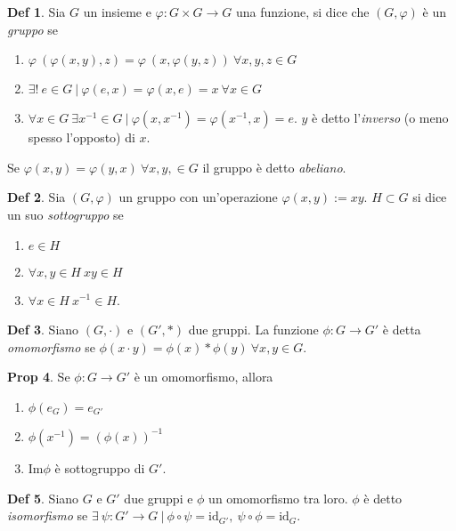 \documentclass[]{article}
\theoremstyle{definition}
\theoremstyle{definition}
\newtheorem{prop}{Prop}[subsection]
\theoremstyle{definition}
\newtheorem{dfn}[prop]{Def}
\begin{document}
 \begin{dfn} Sia $G$ un insieme e $\varphi : G \times G \to G$ una funzione, si dice che $(G, \varphi )$ è un \emph{gruppo} se
\begin{enumerate}
	\item $\varphi \ (\varphi (x,y),z)= \varphi \ (x, \varphi (y,z)) \ \forall x,y,z \in G$
	\item $\exists ! \ e \in G \ | \ \varphi (e,x) = \varphi (x,e) = x \ \forall x \in G$
	\item $\forall x \in G \ \exists x^{-1} \in G \ | \ \varphi (x,x^{-1}) = \varphi (x^{-1},x) = e$. $y$ è detto l'\emph{inverso} (o meno spesso l'opposto) di $x$.
\end{enumerate}
Se $\varphi (x,y) = \varphi (y,x) \ \forall x,y, \in G$ il gruppo è detto \emph{abeliano}.

 \end{dfn}  \begin{dfn} Sia $(G, \varphi)$ un gruppo con un'operazione $\varphi (x,y) := xy$. $H \subset G$ si dice un suo \emph{sottogruppo} se 
\begin{enumerate}
	\item $e \in H$
	\item $\forall x,y \in H \ xy \in H$
	\item $\forall x \in H \ x^{-1} \in H$.
\end{enumerate}

 \end{dfn}  \begin{dfn} Siano $(G, \cdot )$ e $(G', * )$ due gruppi. La funzione $\phi : G \to G'$ è detta \emph{omomorfismo} se $\phi (x \cdot y) = \phi (x) * \phi (y) \ \forall x,y \in G$.

 \end{dfn} \begin{prop} Se $\phi : G \to G'$ è un omomorfismo, allora 
\begin{enumerate}
	\item $\phi (e_G) = e_{G'}$
	\item $\phi (x^{-1}) = (\phi (x))^{-1}$
	\item $\mathrm{Im} \phi$ è sottogruppo di $G'$. 
\end{enumerate}

\end{prop}  \begin{dfn} Siano $G$ e $G'$ due gruppi e $\phi$ un omomorfismo tra loro. $\phi$ è detto \emph{isomorfismo} se $\exists \ \psi : G' \to G \ | \ \phi \circ \psi = \mathrm{id}_{G'}, \ \psi \circ \phi = \mathrm{id}_{G}$.


\end{dfn}
\end{document}
